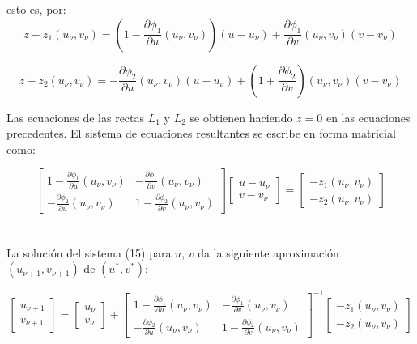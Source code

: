 \documentclass[letter, 10pt]{article}
\begin{document}
esto es, por:
$$
z-z_1(u_\nu,v_\nu) = (1-\frac{{\partial \phi_1}}{{\partial u}}(u_\nu,v_\nu))(u-u_\nu)+\frac{{\partial \phi_1}}{{\partial v}}(u_\nu,v_\nu)(v-v_\nu)
$$

$$
z-z_2(u_\nu,v_\nu) = -\frac{{\partial \phi_2}}{{\partial u}}(u_\nu,v_\nu)(u-u_\nu)+(1+\frac{{\partial \phi_2}}{{\partial v}})(u_\nu,v_\nu)(v-v_\nu)
$$

Las ecuaciones de las rectas $L_1$ y $L_2$ se obtienen haciendo $z = 0$ en las ecuaciones precedentes.
El sistema de ecuaciones resultantes se escribe en forma matricial como:

$$
\begin{bmatrix}{1-\frac{{\partial \phi_1 }}{{\partial u}}(u_ \nu,v_ \nu)
}&{-\frac{{\partial \phi_1 }}{{\partial v}}(u_ \nu,v_ \nu)}\\{-\frac{{\partial
\phi_2 }}{{\partial u}}(u_ \nu,v_ \nu)}&{1-\frac{{\partial \phi_2 }}{{\partial
v}}(u_ \nu,v_ \nu)}\end{bmatrix}\begin{bmatrix}{u-u_ \nu}\\{v-v_
\nu}\end{bmatrix}=\begin{bmatrix}{-z_1(u_ \nu,v_ \nu)}\\{-z_2(u_ \nu,v_
\nu)}\end{bmatrix}
$$
\\\\
La solución del sistema (15) para $u$, $v$ da la siguiente aproximación $(u_{\nu+1}, v_{\nu+1})$ de $(u^*, v^*)$:

$$
\begin{bmatrix}{u_{ \nu+1}}\\{v_{ \nu+1}}\end{bmatrix}=\begin{bmatrix}{u_
\nu}\\{v_ \nu}\end{bmatrix}+\begin{bmatrix}{1-\frac{{\partial \phi_1
}}{{\partial u}}(u_ \nu,v_ \nu)     }&{-\frac{{\partial \phi_1 }}{{\partial
v}}(u_ \nu,v_ \nu)}\\{-\frac{{\partial \phi_2 }}{{\partial u}}(u_ \nu,v_
\nu)}&{1-\frac{{\partial \phi_2 }}{{\partial v}}(u_ \nu,v_
\nu)}\end{bmatrix}^{-1} \begin{bmatrix}{-z_1(u_ \nu,v_ \nu)}\\{-z_2(u_ \nu,v_
\nu)}\end{bmatrix}
$$


\end{document}
